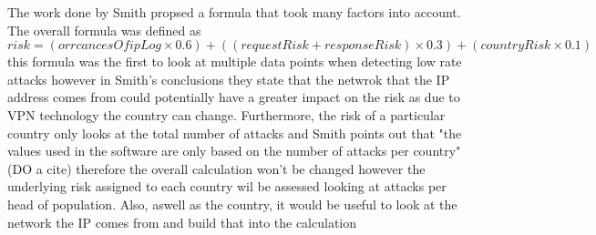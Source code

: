 The work done by Smith propsed a formula that took many factors  into account. The overall formula was defined as  \[risk = (orrcancesOfipLog \times 0.6) + ((requestRisk+responseRisk) \times 0.3) + (countryRisk \times  0.1) \] this formula was the first to look at multiple data points when detecting low rate attacks however in Smith's conclusions they state that the netwrok that the IP address comes from could potentially have a greater impact on the risk as due to VPN technology the country can change. Furthermore, the risk of a particular country only looks at the total number of attacks and Smith points out that  "the values used in the software are only based on the number of attacks per country" (DO a cite) therefore the overall calculation won't be changed however the underlying risk assigned to each country wil be assessed looking at attacks per head of population. Also, aswell as the country, it would be useful to look at the network the IP comes from and build that into the calculation



